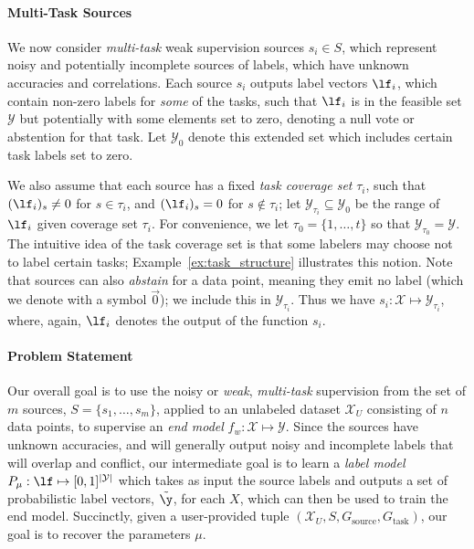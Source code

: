 \documentclass[letterpaper]{article}
\begin{document}
\begin{appendix}
\paragraph*{Multi-Task Sources}
We now consider \textit{multi-task} weak supervision sources $s_i \in S$, which represent noisy and potentially incomplete sources of labels, which have unknown accuracies and correlations.
Each source $s_i$ outputs label vectors $\lf_i$, which contain non-zero labels for \textit{some} of the tasks, such that $\lf_i$ is in the feasible set $\mathcal{Y}$ but potentially with some elements set to zero, denoting a null vote or abstention for that task.
Let $\mathcal{Y}_0$ denote this extended set which includes certain task labels set to zero.

We also assume that each source has a fixed \textit{task coverage set} $\tau_i$, such that $(\lf_i)_s \neq 0$ for $s \in \tau_i$, and $(\lf_i)_s = 0$ for $s \notin \tau_i$; let $\mathcal{Y}_{\tau_i} \subseteq \mathcal{Y}_0$ be the range of $\lf_i$ given coverage set $\tau_i$.
For convenience, we let $\tau_0 = \{1, \ldots, t\}$ so that $\mathcal{Y}_{\tau_0} = \mathcal{Y}$.
The intuitive idea of the task coverage set is that some labelers may choose not to label certain tasks; Example~\ref{ex:task_structure} illustrates this notion.
Note that sources can also \textit{abstain} for a data point, meaning they emit no label (which we denote with a symbol $\vec{0}$); we include this in $\mathcal{Y}_{\tau_i}$.
Thus we have $s_i : \mathcal{X} \mapsto \mathcal{Y}_{\tau_i}$, where, again, $\lf_i$ denotes the output of the function $s_i$.


\paragraph*{Problem Statement}
Our overall goal is to use the noisy or \textit{weak}, \textit{multi-task} supervision from the set of $m$ sources, $S = \{ s_1, \ldots, s_m \}$, applied to an unlabeled dataset $\mathcal{X}_U$ consisting of $n$ data points, to supervise an \textit{end model} $f_w : \mathcal{X} \mapsto \mathcal{Y}$.
Since the sources have unknown accuracies, and will generally output noisy and incomplete labels that will overlap and conflict, our intermediate goal is to learn a \textit{label model} $P_\mu : \lf \mapsto [0,1]^{|\mathcal{Y}|}$ which takes as input the source labels and outputs a set of probabilistic label vectors, $\tilde{\y}$, for each $X$, which can then be used to train the end model.
Succinctly, given a user-provided tuple $(\mathcal{X}_U, S, G_{\text{source}}, G_{\text{task}})$, our goal is to recover the parameters $\mu$.


\end{appendix}
\end{document}
